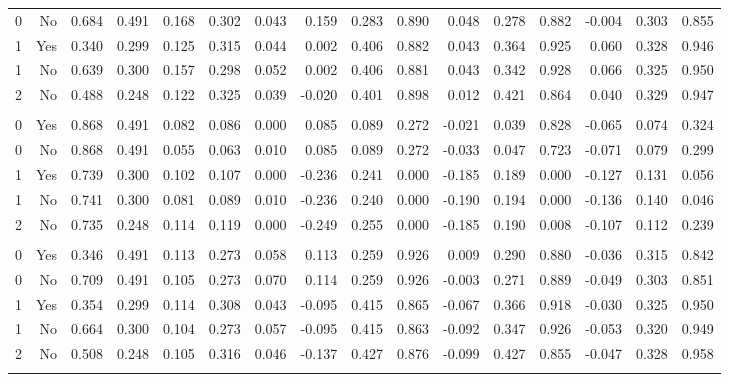 \begin{tabular}{*{16}{r}}
0 & No & 0.684 & 0.491 & 0.168 & 0.302 & 0.043 & 0.159 & 0.283 & 0.890 & 0.048 & 0.278 & 0.882 & -0.004 & 0.303 & 0.855 \\ 
1 & Yes & 0.340 & 0.299 & 0.125 & 0.315 & 0.044 & 0.002 & 0.406 & 0.882 & 0.043 & 0.364 & 0.925 & 0.060 & 0.328 & 0.946 \\ 
1 & No & 0.639 & 0.300 & 0.157 & 0.298 & 0.052 & 0.002 & 0.406 & 0.881 & 0.043 & 0.342 & 0.928 & 0.066 & 0.325 & 0.950 \\ 
2 & No & 0.488 & 0.248 & 0.122 & 0.325 & 0.039 & -0.020 & 0.401 & 0.898 & 0.012 & 0.421 & 0.864 & 0.040 & 0.329 & 0.947 \\ 
\addlinespace 
 \multicolumn{16}{l}{\textbf{4. Complex $f$}} \\ 
0 & Yes & 0.868 & 0.491 & 0.082 & 0.086 & 0.000 & 0.085 & 0.089 & 0.272 & -0.021 & 0.039 & 0.828 & -0.065 & 0.074 & 0.324 \\ 
0 & No & 0.868 & 0.491 & 0.055 & 0.063 & 0.010 & 0.085 & 0.089 & 0.272 & -0.033 & 0.047 & 0.723 & -0.071 & 0.079 & 0.299 \\ 
1 & Yes & 0.739 & 0.300 & 0.102 & 0.107 & 0.000 & -0.236 & 0.241 & 0.000 & -0.185 & 0.189 & 0.000 & -0.127 & 0.131 & 0.056 \\ 
1 & No & 0.741 & 0.300 & 0.081 & 0.089 & 0.010 & -0.236 & 0.240 & 0.000 & -0.190 & 0.194 & 0.000 & -0.136 & 0.140 & 0.046 \\ 
2 & No & 0.735 & 0.248 & 0.114 & 0.119 & 0.000 & -0.249 & 0.255 & 0.000 & -0.185 & 0.190 & 0.008 & -0.107 & 0.112 & 0.239 \\ 
\addlinespace 
 \multicolumn{16}{l}{\textbf{5. Complex $f$ with linear confound.}} \\ 
0 & Yes & 0.346 & 0.491 & 0.113 & 0.273 & 0.058 & 0.113 & 0.259 & 0.926 & 0.009 & 0.290 & 0.880 & -0.036 & 0.315 & 0.842 \\ 
0 & No & 0.709 & 0.491 & 0.105 & 0.273 & 0.070 & 0.114 & 0.259 & 0.926 & -0.003 & 0.271 & 0.889 & -0.049 & 0.303 & 0.851 \\ 
1 & Yes & 0.354 & 0.299 & 0.114 & 0.308 & 0.043 & -0.095 & 0.415 & 0.865 & -0.067 & 0.366 & 0.918 & -0.030 & 0.325 & 0.950 \\ 
1 & No & 0.664 & 0.300 & 0.104 & 0.273 & 0.057 & -0.095 & 0.415 & 0.863 & -0.092 & 0.347 & 0.926 & -0.053 & 0.320 & 0.949 \\ 
2 & No & 0.508 & 0.248 & 0.105 & 0.316 & 0.046 & -0.137 & 0.427 & 0.876 & -0.099 & 0.427 & 0.855 & -0.047 & 0.328 & 0.958 \\ 
\addlinespace 
 \multicolumn{16}{l}{\textbf{6. Complex $f$ with linear and non-linear confound.}} \\ 

\end{tabular}
